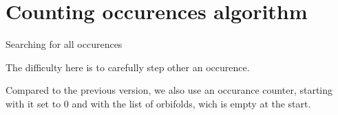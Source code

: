 \section{Counting occurences algorithm}

Searching for all occurences 

The difficulty here is to carefully step other an occurence. 

Compared to the previous version, we also use an occurance counter, starting with it set to 0 
and with the list of orbifolds, wich is empty at the start.

